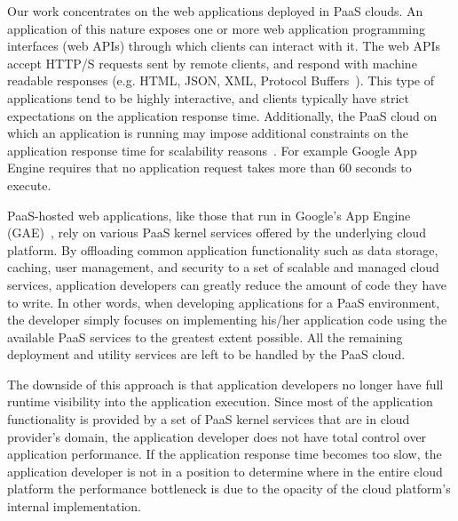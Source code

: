 

Our work concentrates on the web
applications deployed in PaaS clouds. An application of this nature exposes
one or more web application programming interfaces (web APIs) through which
clients can interact with it. The web APIs accept HTTP/S requests sent by
remote clients, and respond with machine readable responses (e.g. HTML, JSON,
XML, Protocol Buffers~\cite{protobuff}). This type of applications tend to be highly
interactive, and clients typically have strict expectations on the application
response time. 
Additionally, the PaaS cloud on
which an application is running may impose additional constraints on the
application response time for scalability
reasons~\cite{azure-limits,gae-limits}.  For example Google App Engine
requires that no application request takes more than 60 seconds to execute.

PaaS-hosted web applications, like those that run in Google's App Engine
(GAE)~\cite{gae},  
rely on various PaaS kernel services offered by the underlying
cloud platform. 
By offloading common application functionality such as data storage, caching,
user management, and security to a set of scalable and
managed cloud services, application developers
can greatly reduce the amount of code they have to write. 
In other words, when developing applications for a PaaS environment, the
developer simply focuses on implementing his/her application code
using the available PaaS services to the greatest extent possible.
All the remaining deployment and utility services are left to be handled 
by the PaaS cloud. 

The downside of this approach is that application developers no longer have full runtime visibility
into the application execution. Since most of the application functionality is provided by a set 
of PaaS kernel services that are in cloud provider's domain, the application
developer does not have total control over application performance. If the application 
response time becomes too slow, the application developer is not in a position to determine
where in the entire cloud platform the performance bottleneck is due to the opacity of the cloud
platform's internal implementation. 

